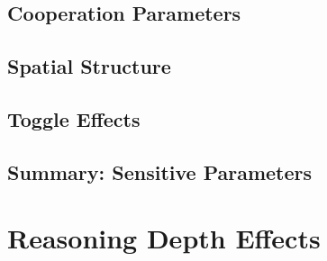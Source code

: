 \subsection{Cooperation Parameters}

\subsection{Spatial Structure}

\subsection{Toggle Effects}

\subsection{Summary: Sensitive Parameters}

\section{Reasoning Depth Effects}
%

